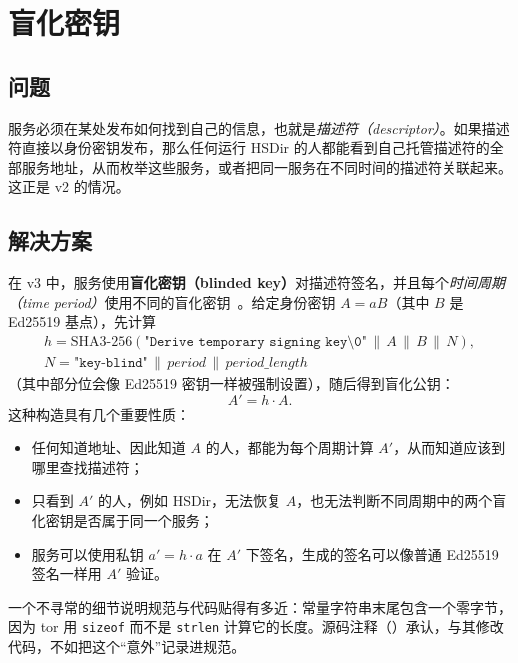 \section{盲化密钥}\label{sec:os-accecate}

\subsection{问题}

服务必须在某处发布如何找到自己的信息，也就是\emph{描述符（descriptor）}。如果描述符直接以身份密钥发布，那么任何运行 HSDir 的人都能看到自己托管描述符的全部服务地址，从而枚举这些服务，或者把同一服务在不同时间的描述符关联起来。这正是 v2 的情况。

\subsection{解决方案}

在 v3 中，服务使用\textbf{盲化密钥（blinded key）}对描述符签名，并且每个\emph{时间周期（time period）}使用不同的盲化密钥~。给定身份密钥 $A=aB$（其中 $B$ 是 Ed25519 基点），先计算
\begin{gather*}
h = \mathrm{SHA3\text{-}256}(\texttt{"Derive temporary signing key\textbackslash 0"} \,\|\, A \,\|\, B \,\|\, N), \\
N = \texttt{"key-blind"} \,\|\, \mathit{period} \,\|\, \mathit{period\_length}
\end{gather*}
（其中部分位会像 Ed25519 密钥一样被强制设置），随后得到盲化公钥：
\[
A' = h \cdot A.
\]
这种构造具有几个重要性质：
\begin{itemize}
  \item 任何知道地址、因此知道 $A$ 的人，都能为每个周期计算 $A'$，从而知道应该到哪里查找描述符；
  \item 只看到 $A'$ 的人，例如 HSDir，无法恢复 $A$，也无法判断不同周期中的两个盲化密钥是否属于同一个服务；
  \item 服务可以使用私钥 $a'=h\cdot a$ 在 $A'$ 下签名，生成的签名可以像普通 Ed25519 签名一样用 $A'$ 验证。
\end{itemize}

一个不寻常的细节说明规范与代码贴得有多近：常量字符串末尾包含一个零字节，因为 tor 用 \texttt{sizeof} 而不是 \texttt{strlen} 计算它的长度。源码注释（）承认，与其修改代码，不如把这个“意外”记录进规范。

